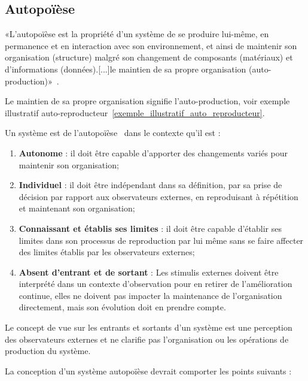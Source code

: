 \subsection{Autopoïèse}

«L'autopoïèse est la propriété d'un système de se produire lui-même, en permanence et en interaction avec son environnement, et ainsi de maintenir son organisation (structure) malgré son changement de composants (matériaux) et d'informations (données).[...]le maintien de sa propre organisation (auto-production)»~\cite{wiki_autopoiesis_2022}.

Le maintien de sa propre organisation signifie l'auto-production, voir exemple illustratif auto-reproducteur~\ref{exemple_illustratif_auto_reproducteur}.

Un système est de l'autopoïèse~\cite{tatsuya_computational_autopoiesis_2000} dans le contexte qu'il est : 
\begin{enumerate}
    \item \textbf{Autonome} : il doit être capable d'apporter des changements variés pour maintenir son organisation;
    \item \textbf{Individuel} : il doit être indépendant dans sa définition, par sa prise de décision par rapport aux observateurs externes, en reproduisant à répétition et maintenant son organisation;
    \item \textbf{Connaissant et établis ses limites} : il doit être capable d'établir ses limites dans son processus de reproduction par lui même sans se faire affecter des limites établis par les observateurs externes;
    \item \textbf{Absent d'entrant et de sortant} : Les stimulis externes doivent être interprété dans un contexte d'observation pour en retirer de l'amélioration continue, elles ne doivent pas impacter la maintenance de l'organisation directement, mais son évolution doit en prendre compte.
\end{enumerate}

Le concept de vue sur les entrants et sortants d'un système est une perception des observateurs externes et ne clarifie pas l'organisation ou les opérations de production du système. %


La conception d'un système autopoïèse\cite{tatsuya_computational_autopoiesis_2000} devrait comporter les points suivants : 

